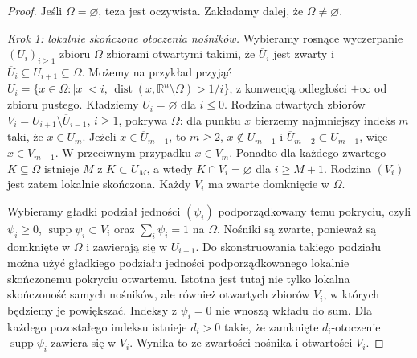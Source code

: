 \begin{proof}
Jeśli $\Omega=\varnothing$, teza jest oczywista.
Zakładamy dalej, że $\Omega\ne\varnothing$.

\emph{Krok 1: lokalnie skończone otoczenia nośników.}
Wybieramy rosnące wyczerpanie $(U_i)_{i\ge1}$
zbioru $\Omega$ zbiorami otwartymi takimi, że
$\overline U_i$ jest zwarty i
$\overline U_i\subseteq U_{i+1}\subseteq\Omega$.
Możemy na przykład przyjąć
$U_i=\{x\in\Omega:|x|<i,\,
\operatorname{dist}(x,\mathbb R^n\setminus\Omega)>1/i\}$,
z konwencją odległości $+\infty$ od zbioru pustego.
Kładziemy $U_i=\varnothing$ dla $i\le0$.
Rodzina otwartych zbiorów
$V_i=U_{i+1}\setminus\overline U_{i-1}$,
$i\ge1$, pokrywa $\Omega$: dla punktu $x$
bierzemy najmniejszy indeks $m$ taki, że
$x\in U_m$. Jeżeli $x\in\overline U_{m-1}$, to $m\ge2$,
$x\notin U_{m-1}$ i
$\overline U_{m-2}\subset U_{m-1}$,
więc $x\in V_{m-1}$.
W przeciwnym przypadku $x\in V_m$.
Ponadto dla każdego zwartego $K\subseteq\Omega$
istnieje $M$ z $K\subset U_M$, a wtedy
$K\cap V_i=\varnothing$ dla $i\ge M+1$.
Rodzina $(V_i)$ jest zatem lokalnie skończona.
Każdy $V_i$ ma zwarte domknięcie w $\Omega$.

Wybieramy gładki podział jedności $(\psi_i)$
podporządkowany temu pokryciu, czyli
$\psi_i\ge0$, $\operatorname{supp}\psi_i\subset V_i$
oraz $\sum_i\psi_i=1$ na $\Omega$.
Nośniki są zwarte, ponieważ są domknięte
w $\Omega$ i zawierają się w $\overline U_{i+1}$.
Do skonstruowania takiego podziału można użyć
gładkiego podziału jedności podporządkowanego
lokalnie skończonemu pokryciu otwartemu.
Istotna jest tutaj nie tylko lokalna skończoność
samych nośników, ale również otwartych zbiorów
$V_i$, w których będziemy je powiększać.
Indeksy z $\psi_i=0$ nie wnoszą wkładu do sum.
Dla każdego pozostałego indeksu istnieje $d_i>0$
takie, że zamknięte $d_i$-otoczenie
$\operatorname{supp}\psi_i$ zawiera się w $V_i$.
Wynika to ze zwartości nośnika i otwartości $V_i$.


\end{proof}
